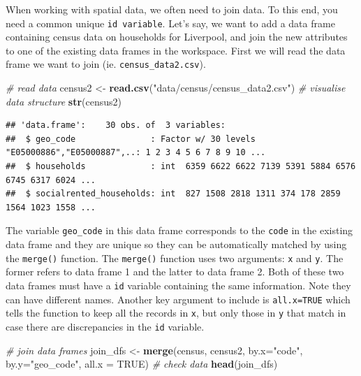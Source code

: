 \documentclass[]{book}
\newenvironment{Shaded}{\begin{snugshade}}{\end{snugshade}}
\newcommand{\CommentTok}[1]{\textcolor[rgb]{0.56,0.35,0.01}{\textit{#1}}}
\newcommand{\DataTypeTok}[1]{\textcolor[rgb]{0.13,0.29,0.53}{#1}}
\newcommand{\KeywordTok}[1]{\textcolor[rgb]{0.13,0.29,0.53}{\textbf{#1}}}
\newcommand{\NormalTok}[1]{#1}
\newcommand{\OtherTok}[1]{\textcolor[rgb]{0.56,0.35,0.01}{#1}}
\newcommand{\StringTok}[1]{\textcolor[rgb]{0.31,0.60,0.02}{#1}}
\begin{document}
When working with spatial data, we often need to join data. To this end, you need a common unique \texttt{id\ variable}. Let's say, we want to add a data frame containing census data on households for Liverpool, and join the new attributes to one of the existing data frames in the workspace. First we will read the data frame we want to join (ie. \texttt{census\_data2.csv}).

\begin{Shaded}
\begin{Highlighting}[]
\CommentTok{# read data}
\NormalTok{census2 <-}\StringTok{ }\KeywordTok{read.csv}\NormalTok{(}\StringTok{"data/census/census_data2.csv"}\NormalTok{)}
\CommentTok{# visualise data structure}
\KeywordTok{str}\NormalTok{(census2)}
\end{Highlighting}
\end{Shaded}

\begin{verbatim}
## 'data.frame':    30 obs. of  3 variables:
##  $ geo_code               : Factor w/ 30 levels "E05000886","E05000887",..: 1 2 3 4 5 6 7 8 9 10 ...
##  $ households             : int  6359 6622 6622 7139 5391 5884 6576 6745 6317 6024 ...
##  $ socialrented_households: int  827 1508 2818 1311 374 178 2859 1564 1023 1558 ...
\end{verbatim}

The variable \texttt{geo\_code} in this data frame corresponds to the \texttt{code} in the existing data frame and they are unique so they can be automatically matched by using the \texttt{merge()} function. The \texttt{merge()} function uses two arguments: \texttt{x} and \texttt{y}. The former refers to data frame 1 and the latter to data frame 2. Both of these two data frames must have a \texttt{id} variable containing the same information. Note they can have different names. Another key argument to include is \texttt{all.x=TRUE} which tells the function to keep all the records in \texttt{x}, but only those in \texttt{y} that match in case there are discrepancies in the \texttt{id} variable.

\begin{Shaded}
\begin{Highlighting}[]
\CommentTok{# join data frames}
\NormalTok{join_dfs <-}\StringTok{ }\KeywordTok{merge}\NormalTok{(census, census2, }\DataTypeTok{by.x=}\StringTok{"code"}\NormalTok{, }\DataTypeTok{by.y=}\StringTok{"geo_code"}\NormalTok{, }\DataTypeTok{all.x =} \OtherTok{TRUE}\NormalTok{)}
\CommentTok{# check data}
\KeywordTok{head}\NormalTok{(join_dfs)}
\end{Highlighting}
\end{Shaded}
\end{document}
